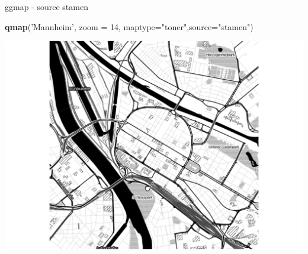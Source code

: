 \documentclass[ignorenonframetext,]{beamer}
\newenvironment{Shaded}{}{}
\newcommand{\KeywordTok}[1]{\textcolor[rgb]{0.00,0.44,0.13}{\textbf{{#1}}}}
\newcommand{\DataTypeTok}[1]{\textcolor[rgb]{0.56,0.13,0.00}{{#1}}}
\newcommand{\DecValTok}[1]{\textcolor[rgb]{0.25,0.63,0.44}{{#1}}}
\newcommand{\StringTok}[1]{\textcolor[rgb]{0.25,0.44,0.63}{{#1}}}
\newcommand{\NormalTok}[1]{{#1}}
\begin{document}
\begin{frame}[fragile]{ggmap - source stamen}

\begin{Shaded}
\begin{Highlighting}[]
\KeywordTok{qmap}\NormalTok{(}\StringTok{'Mannheim'}\NormalTok{, }\DataTypeTok{zoom =} \DecValTok{14}\NormalTok{,}
 \DataTypeTok{maptype=}\StringTok{"toner"}\NormalTok{,}\DataTypeTok{source=}\StringTok{"stamen"}\NormalTok{)}
\end{Highlighting}
\end{Shaded}

\includegraphics{R_intern_files/figure-beamer/unnamed-chunk-272-1.pdf}

\end{frame}
\end{document}
